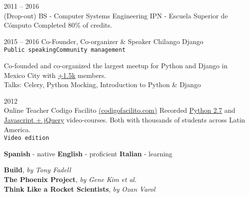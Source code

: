 \documentclass[9pt]{developercv} %
\begin{document}

\begin{entrylist}
    \entry
        {
            2011 -- 2016
            \\\footnotesize{(Drop-out)}
        }
        {BS - Computer Systems Engineering}
        {IPN - Escuela Superior de Cómputo}
        {Completed 80\% of credits.}
\end{entrylist}


\begin{entrylist}
    \entry
        {2015 -- 2016}
        {Co-Founder, Co-organizer \& Speaker}
        {
            Chilango Django \\
            \texttt{Public speaking}\slashsep\texttt{Community management}
        }
        {
            
            Co-founded and co-organized the largest meetup for Python and Django in 
            Mexico City with {\href{https://meetup.com/Chilango-Django/}{\underline{+1.5k}}} members. \\

            \small{Talks: Celery, Python Mocking, Introduction to Python \& Django}
            
        }
    \entry
        {2012\\\footnotesize{Online}}
        {Teacher}
        {Codigo Facilito {\href{(https://codigofacilito.com/}{(codigofacilito.com)}}}
        {
            Recorded 
            {\href{https://www.youtube.com/watch?v=CjmzDHMHxwU&list=PLE549A038CF82905F}{\underline{Python 2.7}}} 
            and {\href{https://www.youtube.com/watch?v=jKbjblt4NXA&list=PLpOqH6AE0tNi47LF-_6gddgq10lp_TLDB}{\underline{Javascript + jQuery}}} 
            video-courses. Both with thousands of students across Latin America.\\
            \texttt{Video edition}
        }
\end{entrylist}


\begin{minipage}[t]{1\textwidth}
    \vspace{-\baselineskip} %
    \textbf{Spanish} - native
    \slashsep\textbf{English} - proficient
    \slashsep\textbf{Italian} - learning
\end{minipage}




\begin{minipage}[t]{1\textwidth}
    \vspace{-\baselineskip} %
    \textbf{Build}, \textit{by Tony Fadell} \\
    \textbf{The Phoenix Project}, \textit{by Gene Kim et al.} \\
    \textbf{Think Like a Rocket Scientists}, \textit{by Ozan Varol} \\
\end{minipage}
\end{document}

